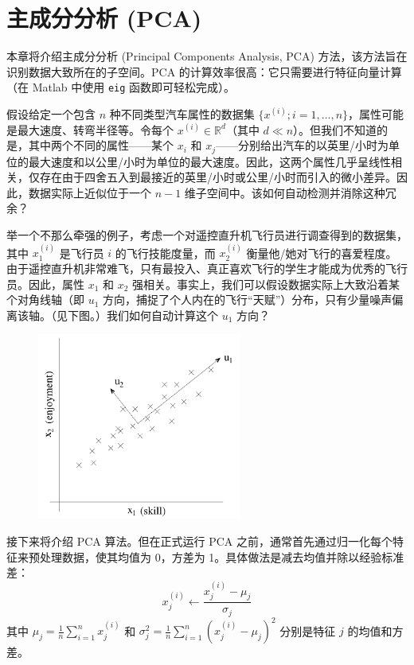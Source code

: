 \chapter{主成分分析 (PCA)}

本章将介绍主成分分析 (Principal Components Analysis, PCA) 方法，该方法旨在识别数据大致所在的子空间。PCA 的计算效率很高：它只需要进行特征向量计算（在 Matlab 中使用 \texttt{eig} 函数即可轻松完成）。

假设给定一个包含 $n$ 种不同类型汽车属性的数据集 $\{x^{(i)}; i = 1, \dots, n\}$，属性可能是最大速度、转弯半径等。令每个 $x^{(i)} \in \mathbb{R}^d$（其中 $d \ll n$）。但我们不知道的是，其中两个不同的属性——某个 $x_i$ 和 $x_j$——分别给出汽车的以英里/小时为单位的最大速度和以公里/小时为单位的最大速度。因此，这两个属性几乎呈线性相关，仅存在由于四舍五入到最接近的英里/小时或公里/小时而引入的微小差异。因此，数据实际上近似位于一个 $n-1$ 维子空间中。该如何自动检测并消除这种冗余？

举一个不那么牵强的例子，考虑一个对遥控直升机飞行员进行调查得到的数据集，其中 $x_1^{(i)}$ 是飞行员 $i$ 的飞行技能度量，而 $x_2^{(i)}$ 衡量他/她对飞行的喜爱程度。由于遥控直升机非常难飞，只有最投入、真正喜欢飞行的学生才能成为优秀的飞行员。因此，属性 $x_1$ 和 $x_2$ 强相关。事实上，我们可以假设数据实际上大致沿着某个对角线轴（即 $u_1$ 方向，捕捉了个人内在的飞行“天赋”）分布，只有少量噪声偏离该轴。（见下图。）我们如何自动计算这个 $u_1$ 方向？

\begin{figure}[H]
    \centering
    \includegraphics[width=0.6\textwidth]{figs/PCA.png}
\end{figure}

接下来将介绍 PCA 算法。但在正式运行 PCA 之前，通常首先通过归一化每个特征来预处理数据，使其均值为 0，方差为 1。具体做法是减去均值并除以经验标准差：
\[
    x_j^{(i)} \leftarrow \frac{x_j^{(i)} - \mu_j}{\sigma_j}
\]
其中 $\mu_j = \frac{1}{n} \sum_{i=1}^n x_j^{(i)}$ 和 $\sigma_j^2 = \frac{1}{n} \sum_{i=1}^n (x_j^{(i)} - \mu_j)^2$ 分别是特征 $j$ 的均值和方差。

